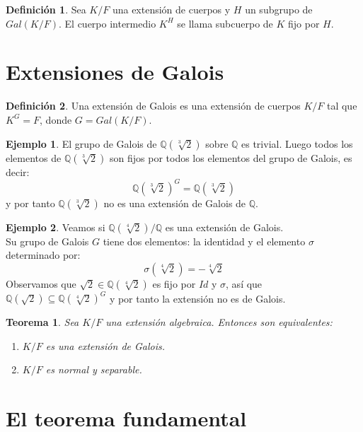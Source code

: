 \documentclass{report}
\newtheorem{theorem}{Teorema}[chapter]
\theoremstyle{remark}
\theoremstyle{definition}
\newtheorem{definition}{Definición}[chapter]
\theoremstyle{definition}
\theoremstyle{definition}
\newtheorem*{example}{Ejemplo}
\begin{document}
\begin{definition}
    Sea $K/F$ una extensión de cuerpos y $H$ un subgrupo de $Gal(K/F)$.
    El cuerpo intermedio $K^H$ se llama subcuerpo de $K$ fijo por $H$.
\end{definition}

\section{Extensiones de Galois}

\begin{definition}
    Una extensión de Galois es una extensión de cuerpos $K/F$ tal que $K^G = F$, donde $G = Gal(K/F)$.
\end{definition}

\begin{example}
    El grupo de Galois de $\mathbb{Q}(\sqrt[3]{2})$ sobre $\mathbb{Q}$ es trivial.
    Luego todos los elementos de $\mathbb{Q}(\sqrt[3]{2})$ son fijos por todos los elementos del grupo de Galois, es decir:
    $$\mathbb{Q}(\sqrt[3]{2})^G = \mathbb{Q}(\sqrt[3]{2})$$
    y por tanto $\mathbb{Q}(\sqrt[3]{2})$ no es una extensión de Galois de $\mathbb{Q}$.
\end{example}

\begin{example}
    Veamos si $\mathbb{Q}(\sqrt[4]{2})/\mathbb{Q}$ es una extensión de Galois.\\
    Su grupo de Galois $G$ tiene dos elementos: la identidad y el elemento $\sigma$ determinado por:
    $$\sigma(\sqrt[4]{2}) = -\sqrt[4]{2}$$
    Observamos que $\sqrt{2} \in \mathbb{Q}(\sqrt[4]{2})$ es fijo por $Id$ y $\sigma$, así que $\mathbb{Q}(\sqrt{2}) \subseteq \mathbb{Q}(\sqrt[4]{2})^G$ y por tanto la extensión no es de Galois.
\end{example}

\begin{theorem}
    Sea $K/F$ una extensión algebraica. Entonces son equivalentes:
    \begin{enumerate}
        \item $K/F$ es una extensión de Galois.
        \item $K/F$ es normal y separable.
    \end{enumerate}
\end{theorem}

\section{El teorema fundamental}
\end{document}
